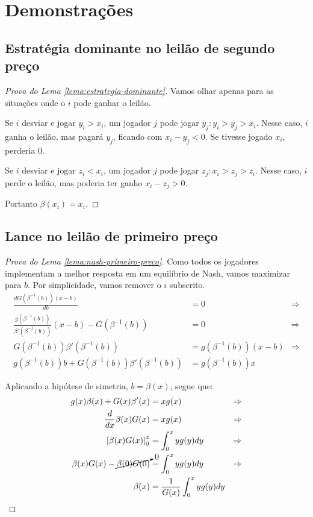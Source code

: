 \chapter{Demonstrações}
\label{cap:apendice}

\section{Estratégia dominante no leilão de segundo preço}
\begin{proof}[Prova do Lema \ref{lema:estrategia-dominante}]
	Vamos olhar apenas para as situações onde o $i$ pode ganhar o leilão.
	
	Se $i$ desviar e jogar $y_i > x_i$, um jogador $j$ pode jogar $y_j : y_i > y_j > x_i$. Nesse caso, $i$ ganha o leilão, mas pagará $y_j$, ficando com $x_i - y_j < 0$. Se tivesse jogado $x_i$, perderia 0.
	
	Se $i$ desviar e jogar $z_i < x_i$, um jogador $j$ pode jogar $z_j : x_i > z_j > z_i$. Nesse caso, $i$ perde o leilão, mas poderia ter ganho $x_i - z_j > 0$.
	
	Portanto $\beta(x_i) = x_i$.
\end{proof}

\section{Lance no leilão de primeiro preço}
\begin{proof}[Prova do Lema \ref{lema:nash-primeiro-preco}]
	Como todos os jogadores implementam a melhor resposta em um equilíbrio de Nash, vamos maximizar para $b$. Por simplicidade, vamos remover o $i$ subscrito.
	\begin{align*}
		\frac{d G(\beta^{-1}(b)) (x - b)}{db} & = 0 & \Rightarrow \\
		\frac{ g( \beta^{-1}(b) ) }{ \beta'( \beta^{-1}(b) ) }(x - b) - G( \beta^{-1}(b) ) & = 0 & \Rightarrow \\
		G( \beta^{-1}(b) )\beta'( {\beta^{-1}(b)} ) & = g( \beta^{-1}(b) )(x - b) & \Rightarrow \\
		g(\beta^{-1}(b))b + G(\beta^{-1}(b))\beta'({\beta^{-1}(b)}) & = g(\beta^{-1}(b))x
	\end{align*}
	
	Aplicando a hipótese de simetria, $b = \beta(x)$, segue que:
	\begin{align*}
		g(x)\beta(x) + G(x)\beta'(x) & = xg(x) & \Rightarrow \\
		\frac{d}{dx} \beta(x)G(x) & = xg(x) & \Rightarrow \\
		\left[ \beta(x)G(x) \right]_{0}^{x} & = \int_{0}^{x} yg(y)dy & \Rightarrow \\
		\beta(x)G(x) - \cancelto{0}{\beta(0)G(0)} & = \int_{0}^{x} yg(y)dy & \Rightarrow \\
		\beta(x) & = \frac{1}{G(x)} \int_{0}^{x} yg(y)dy
	\end{align*}
\end{proof}

